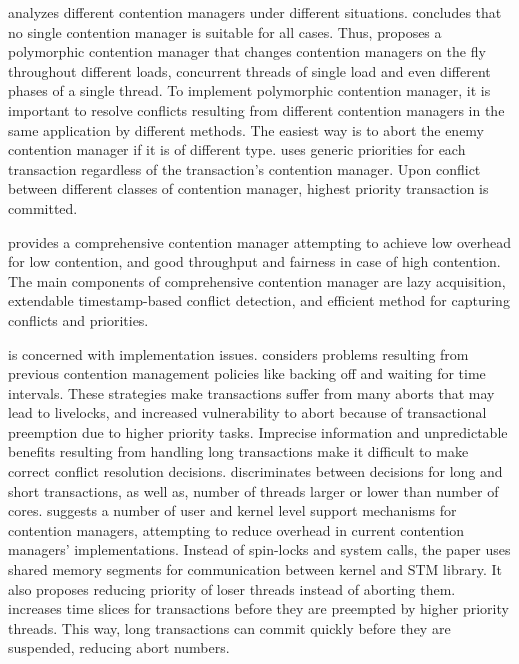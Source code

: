 \documentclass[12pt,english]{report}
\begin{document}
\cite{springerlink:10.1007_11561927_23} analyzes different contention
managers under different situations. \cite{springerlink:10.1007_11561927_23}
concludes that no single contention manager is suitable for all cases.
Thus, \cite{springerlink:10.1007_11561927_23} proposes a polymorphic
contention manager that changes contention managers on the fly throughout
different loads, concurrent threads of single load and even different
phases of a single thread. To implement polymorphic contention manager,
it is important to resolve conflicts resulting from different contention
managers in the same application by different methods. The easiest
way is to abort the enemy contention manager if it is of different
type. \cite{springerlink:10.1007_11561927_23} uses generic priorities
for each transaction regardless of the transaction's contention manager.
Upon conflict between different classes of contention manager, highest
priority transaction is committed.

\cite{Spear:2009:CSC:1504176.1504199} provides a comprehensive contention
manager attempting to achieve low overhead for low contention, and
good throughput and fairness in case of high contention. The main
components of comprehensive contention manager are lazy acquisition,
extendable timestamp-based conflict detection, and efficient method
for capturing conflicts and priorities. 

\cite{Maldonado:2010:SST:1693453.1693465} is concerned with implementation
issues. \cite{Maldonado:2010:SST:1693453.1693465} considers problems
resulting from previous contention management policies like backing
off and waiting for time intervals. These strategies make transactions
suffer from many aborts that may lead to livelocks, and increased
vulnerability to abort because of transactional preemption due to
higher priority tasks. Imprecise information and unpredictable benefits
resulting from handling long transactions make it difficult to make
correct conflict resolution decisions. \cite{Maldonado:2010:SST:1693453.1693465}
discriminates between decisions for long and short transactions, as
well as, number of threads larger or lower than number of cores. \cite{Maldonado:2010:SST:1693453.1693465}
suggests a number of user and kernel level support mechanisms for
contention managers, attempting to reduce overhead in current contention
managers' implementations. Instead of spin-locks and system calls,
the paper uses shared memory segments for communication between kernel
and STM library. It also proposes reducing priority of loser threads
instead of aborting them. \cite{Maldonado:2010:SST:1693453.1693465}
increases time slices for transactions before they are preempted by
higher priority threads. This way, long transactions can commit quickly
before they are suspended, reducing abort numbers.
\end{document}
